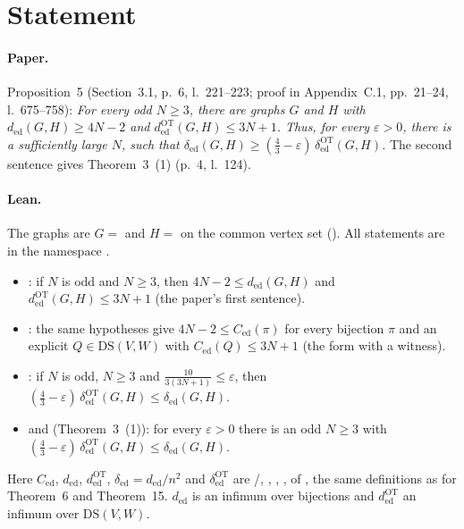 

\paperversion

\section{Statement}

\paragraph{Paper.} Proposition~5 (Section~3.1, p.~6, l.~221--223; proof in Appendix~C.1, pp.~21--24,
l.~675--758): \emph{For every odd $N\ge3$, there are graphs $G$ and $H$ with $d_{\mathrm{ed}}(G,H)\ge4N-2$
and $d^{\mathrm{OT}}_{\mathrm{ed}}(G,H)\le3N+1$. Thus, for every $\varepsilon>0$, there is a sufficiently
large $N$, such that $\delta_{\mathrm{ed}}(G,H)\ge(\frac43-\varepsilon)\,\delta^{\mathrm{OT}}_{\mathrm{ed}}(G,H)$.}
The second sentence gives Theorem~3~(1) (p.~4, l.~124).

\paragraph{Lean.} The graphs are $G=$  and $H=$  on the common vertex set
 (). All statements are in the namespace .
\begin{itemize}
\item {}: if $N$ is odd and $N\ge3$, then
  $4N-2\le d_{\mathrm{ed}}(G,H)$ and $d^{\mathrm{OT}}_{\mathrm{ed}}(G,H)\le3N+1$ \quad (the paper's first sentence).
\item {}: the same hypotheses give $4N-2\le C_{\mathrm{ed}}(\pi)$ for every bijection $\pi$ and
  an explicit $Q\in\mathrm{DS}(V,W)$ with $C_{\mathrm{ed}}(Q)\le3N+1$ (the form with a witness).
\item {}: if $N$ is odd, $N\ge3$ and $\frac{10}{3(3N+1)}\le\varepsilon$, then
  $(\frac43-\varepsilon)\,\delta^{\mathrm{OT}}_{\mathrm{ed}}(G,H)\le\delta_{\mathrm{ed}}(G,H)$.
\item {} and  (Theorem~3~(1)): for every $\varepsilon>0$ there is an odd
  $N\ge3$ with $(\frac43-\varepsilon)\,\delta^{\mathrm{OT}}_{\mathrm{ed}}(G,H)\le\delta_{\mathrm{ed}}(G,H)$.
\end{itemize}
Here $C_{\mathrm{ed}}$, $d_{\mathrm{ed}}$, $d^{\mathrm{OT}}_{\mathrm{ed}}$, $\delta_{\mathrm{ed}}=d_{\mathrm{ed}}/n^2$
and $\delta^{\mathrm{OT}}_{\mathrm{ed}}$ are /, , ,
,  of , the same definitions as for
Theorem~6 and Theorem~15. $d_{\mathrm{ed}}$ is an infimum over bijections and $d^{\mathrm{OT}}_{\mathrm{ed}}$ an
infimum over $\mathrm{DS}(V,W)$.

